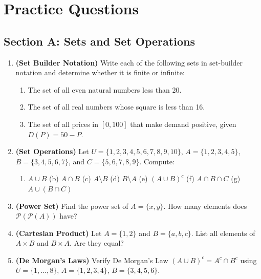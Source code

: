 \documentclass[12pt, a4paper]{article}
\theoremstyle{definition}
\newcommand{\powerset}{\mathcal{P}}
\begin{document}
\newpage
\section{Practice Questions}

\subsection{Section A: Sets and Set Operations}

\begin{enumerate}[label=\textbf{A\arabic*.}, leftmargin=2.5em]

  \item \textbf{(Set Builder Notation)} Write each of the following sets in set-builder notation and determine whether it is finite or infinite:
  \begin{enumerate}[label=(\alph*)]
    \item The set of all even natural numbers less than 20.
    \item The set of all real numbers whose square is less than 16.
    \item The set of all prices in $[0, 100]$ that make demand positive, given $D(P) = 50 - P$.
  \end{enumerate}

  \item \textbf{(Set Operations)} Let $U = \{1,2,3,4,5,6,7,8,9,10\}$, $A = \{1,2,3,4,5\}$, $B = \{3,4,5,6,7\}$, and $C = \{5,6,7,8,9\}$. Compute:
  \begin{enumerate}[label=(\alph*)]
    \item $A \cup B$ \quad (b) $A \cap B$ \quad (c) $A \setminus B$ \quad (d) $B \setminus A$ \quad (e) $(A \cup B)^c$ \quad (f) $A \cap B \cap C$ \quad (g) $A \cup (B \cap C)$
  \end{enumerate}

  \item \textbf{(Power Set)} Find the power set of $A = \{x, y\}$. How many elements does $\powerset(\powerset(A))$ have?

  \item \textbf{(Cartesian Product)} Let $A = \{1, 2\}$ and $B = \{a, b, c\}$. List all elements of $A \times B$ and $B \times A$. Are they equal?

  \item \textbf{(De Morgan's Laws)} Verify De Morgan's Law $(A \cup B)^c = A^c \cap B^c$ using $U = \{1,\ldots,8\}$, $A=\{1,2,3,4\}$, $B=\{3,4,5,6\}$.


\end{enumerate}
\end{document}
